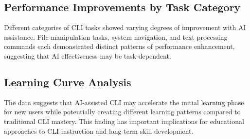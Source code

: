 \subsection{Performance Improvements by Task Category}

Different categories of CLI tasks showed varying degrees of improvement with AI assistance. File manipulation tasks, system navigation, and text processing commands each demonstrated distinct patterns of performance enhancement, suggesting that AI effectiveness may be task-dependent.

\subsection{Learning Curve Analysis}

The data suggests that AI-assisted CLI may accelerate the initial learning phase for new users while potentially creating different learning patterns compared to traditional CLI mastery. This finding has important implications for educational approaches to CLI instruction and long-term skill development.
